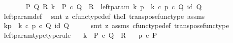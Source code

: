 \begin{isabellebody}
%
\isadelimproof
%
\endisadelimproof
%
\isatagproof
{}\isamarkupfalse%
\ {\isacharminus}{\kern0pt}\ \isanewline
\ \ \isamarkupfalse%
\ {\isachardoublequoteopen}{\isasymexists}\ P\ Q\ R{\isachardot}{\kern0pt}\ k\ {\isacharcolon}{\kern0pt}\ P\ {\isasymtimes}\isactrlsub c\ Q\ {\isasymrightarrow}\ R\ {\isasymand}\ left{\isacharunderscore}{\kern0pt}param\ k\ p\ {\isacharequal}{\kern0pt}\ k\ {\isasymcirc}\isactrlsub c\ {\isasymlangle}p\ {\isasymcirc}\isactrlsub c\ {\isasymbeta}\isactrlbsub Q\isactrlesub {\isacharcomma}{\kern0pt}\ id\ Q{\isasymrangle}{\isachardoublequoteclose}\isanewline
\ \ \ \ \isamarkupfalse%
\ left{\isacharunderscore}{\kern0pt}param{\isacharunderscore}{\kern0pt}def\ \isamarkupfalse%
\ {\isacharparenleft}{\kern0pt}smt\ {\isacharparenleft}{\kern0pt}z{}{\isacharparenright}{\kern0pt}\ cfunc{\isacharunderscore}{\kern0pt}type{\isacharunderscore}{\kern0pt}def\ the{}I{}\ transpose{\isacharunderscore}{\kern0pt}func{\isacharunderscore}{\kern0pt}type\ assms{\isacharparenright}{\kern0pt}\ \isanewline
\ \ \isamarkupfalse%
\ \isamarkupfalse%
\ {\isachardoublequoteopen}k\isactrlbsub {\isacharbrackleft}{\kern0pt}p{\isacharcomma}{\kern0pt}{\isacharminus}{\kern0pt}{\isacharbrackright}{\kern0pt}\isactrlesub \ {\isasymequiv}\ k\ {\isasymcirc}\isactrlsub c\ {\isasymlangle}p\ {\isasymcirc}\isactrlsub c\ {\isasymbeta}\isactrlbsub Q\isactrlesub {\isacharcomma}{\kern0pt}\ id\ Q{\isasymrangle}{\isachardoublequoteclose}\isanewline
\ \ \ \ \isamarkupfalse%
\ {\isacharparenleft}{\kern0pt}smt\ {\isacharparenleft}{\kern0pt}z{}{\isacharparenright}{\kern0pt}\ assms\ cfunc{\isacharunderscore}{\kern0pt}type{\isacharunderscore}{\kern0pt}def\ transpose{\isacharunderscore}{\kern0pt}func{\isacharunderscore}{\kern0pt}type{\isacharparenright}{\kern0pt}\isanewline
{}\isamarkupfalse%
%
\endisatagproof
{\isafoldproof}%
%
\isadelimproof
\isanewline
%
\endisadelimproof
\isanewline
{}\isamarkupfalse%
\ left{\isacharunderscore}{\kern0pt}param{\isacharunderscore}{\kern0pt}type{\isacharbrackleft}{\kern0pt}type{\isacharunderscore}{\kern0pt}rule{\isacharbrackright}{\kern0pt}{\isacharcolon}{\kern0pt}\isanewline
\ \ \ {\isachardoublequoteopen}k\ {\isacharcolon}{\kern0pt}\ P\ {\isasymtimes}\isactrlsub c\ Q\ {\isasymrightarrow}\ R{\isachardoublequoteclose}\isanewline
\ \ \ {\isachardoublequoteopen}p\ {\isasymin}\isactrlsub c\ P{\isachardoublequoteclose}\isanewline

\end{isabellebody}
